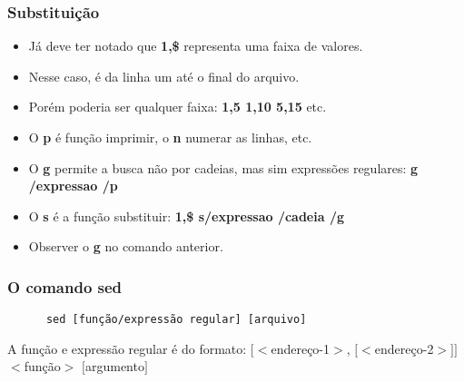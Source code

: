 \documentclass{beamer}
\begin{document}
   \begin{frame}
      \frametitle{Substituição}
      \begin{itemize}
         \item Já deve ter notado que \textbf{1,\$} representa uma faixa de valores. 
         \item Nesse caso, é da linha um até o final do arquivo. 
         \item Porém poderia ser qualquer faixa: \textbf{1,5 1,10 5,15} etc. 
         \item O \textbf{p} é função imprimir, o \textbf{n} numerar as linhas, etc. 
         \item O \textbf{g} permite a busca não por cadeias, mas sim expressões regulares: \textbf{g \slash expressao \slash p} 
         \item O \textbf{s} é a função substituir: \textbf{1,\$ s\slash expressao \slash cadeia \slash g} 
         \item Observer o \textbf{g} no comando anterior. 
      \end{itemize}
    \end{frame}


\begin{frame}[fragile]
   \frametitle{O comando sed}
   \begin{center}
      \begin{verbatim}
      sed [função/expressão regular] [arquivo]
      \end{verbatim}
   \end{center}
   \begin{block}{A função e expressão regular é do formato:}
      $[<$endereço-1$>$, $[<$endereço-2$>]]$ $<$função$>$ $[$argumento$]$
   \end{block}
\end{frame}
\end{document}

